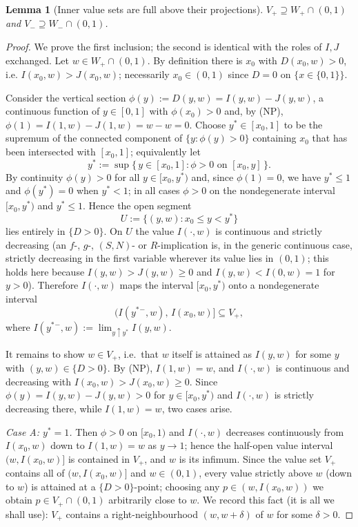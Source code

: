 \documentclass{amsart}
\theoremstyle{plain}
\newtheorem{lemma}{Lemma}
\theoremstyle{definition}
\begin{document}
\begin{lemma}[Inner value sets are full above their projections]\label{lem:value}
$V_+\supseteq W_+\cap(0,1)$ and $V_-\supseteq W_-\cap(0,1)$.
\end{lemma}

\begin{proof}
We prove the first inclusion; the second is identical with the roles of $I,J$ exchanged.
Let $w\in W_+\cap(0,1)$. By definition there is $x_0$ with $D(x_0,w)>0$, i.e.
$I(x_0,w)>J(x_0,w)$; necessarily $x_0\in(0,1)$ since $D=0$ on $\{x\in\{0,1\}\}$.

Consider the vertical section $\phi(y):=D(y,w)=I(y,w)-J(y,w)$, a continuous function of
$y\in[0,1]$ with $\phi(x_0)>0$ and, by (NP),
$\phi(1)=I(1,w)-J(1,w)=w-w=0$. Choose $y^\ast\in[x_0,1]$ to be the supremum of the
connected component of $\{y:\phi(y)>0\}$ containing $x_0$ that has been intersected with
$[x_0,1]$; equivalently let
\[
y^\ast:=\sup\{\,y\in[x_0,1]:\phi>0\text{ on }[x_0,y]\,\}.
\]
By continuity $\phi(y)>0$ for all $y\in[x_0,y^\ast)$ and, since $\phi(1)=0$, we have
$y^\ast\le 1$ and $\phi(y^\ast)=0$ when $y^\ast<1$; in all cases $\phi>0$ on the
nondegenerate interval $[x_0,y^\ast)$ and $y^\ast\le1$. Hence the open segment
\[
U:=\{(y,w):x_0\le y<y^\ast\}
\]
lies entirely in $\{D>0\}$. On $U$ the value $I(\cdot,w)$ is continuous and strictly
decreasing (an $f$-, $g$-, $(S,N)$- or $R$-implication is, in the generic continuous case,
strictly decreasing in the first variable wherever its value lies in $(0,1)$; this holds
here because $I(y,w)>J(y,w)\ge0$ and $I(y,w)<I(0,w)=1$ for $y>0$). Therefore
$I(\cdot,w)$ maps the interval $[x_0,y^\ast)$ onto a nondegenerate interval
\[
\bigl(I(y^\ast{}^{-},w),\,I(x_0,w)\bigr]\subseteq V_+ ,
\]
where $I(y^\ast{}^{-},w):=\lim_{y\uparrow y^\ast}I(y,w)$.

It remains to show $w\in V_+$, i.e.\ that $w$ itself is attained as $I(y,w)$ for some
$y$ with $(y,w)\in\{D>0\}$. By (NP), $I(1,w)=w$, and $I(\cdot,w)$ is continuous and
decreasing with $I(x_0,w)>J(x_0,w)\ge 0$. Since $\phi(y)=I(y,w)-J(y,w)>0$ for
$y\in[x_0,y^\ast)$ and $I(\cdot,w)$ is strictly decreasing there, while $I(1,w)=w$, two
cases arise.

\emph{Case A: $y^\ast=1$.} Then $\phi>0$ on $[x_0,1)$ and $I(\cdot,w)$ decreases
continuously from $I(x_0,w)$ down to $I(1,w)=w$ as $y\to1$; hence the half-open value
interval $\bigl(w,I(x_0,w)\bigr]$ is contained in $V_+$, and $w$ is its infimum. Since the
value set $V_+$ contains all of $(w,I(x_0,w)]$ and $w\in(0,1)$, every value strictly
above $w$ (down to $w$) is attained at a $\{D>0\}$-point; choosing any
$p\in(w,I(x_0,w))$ we obtain $p\in V_+\cap(0,1)$ arbitrarily close to $w$. We record this
fact (it is all we shall use): $V_+$ contains a right-neighbourhood $(w,w+\delta)$ of $w$
for some $\delta>0$.


\end{proof}
\end{document}
